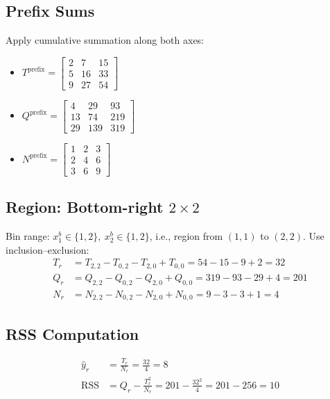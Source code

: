 \documentclass{article}
\begin{document}
\subsection*{Prefix Sums}
Apply cumulative summation along both axes:

\begin{itemize}
    \item $T^{\text{prefix}} = \begin{bmatrix} 2 & 7 & 15 \\ 5 & 16 & 33 \\ 9 & 27 & 54 \end{bmatrix}$
    \item $Q^{\text{prefix}} = \begin{bmatrix} 4 & 29 & 93 \\ 13 & 74 & 219 \\ 29 & 139 & 319 \end{bmatrix}$
    \item $N^{\text{prefix}} = \begin{bmatrix} 1 & 2 & 3 \\ 2 & 4 & 6 \\ 3 & 6 & 9 \end{bmatrix}$
\end{itemize}

\subsection*{Region: Bottom-right $2 \times 2$}
Bin range: $x_1^b \in \{1,2\},\ x_2^b \in \{1,2\}$, i.e., region from $(1,1)$ to $(2,2)$.
Use inclusion--exclusion:
\begin{align*}
T_r &= T_{2,2} - T_{0,2} - T_{2,0} + T_{0,0} = 54 - 15 - 9 + 2 = 32 \\
Q_r &= Q_{2,2} - Q_{0,2} - Q_{2,0} + Q_{0,0} = 319 - 93 - 29 + 4 = 201 \\
N_r &= N_{2,2} - N_{0,2} - N_{2,0} + N_{0,0} = 9 - 3 - 3 + 1 = 4
\end{align*}

\subsection*{RSS Computation}
\begin{align*}
\hat{y}_r &= \frac{T_r}{N_r} = \frac{32}{4} = 8 \\
\text{RSS} &= Q_r - \frac{T_r^2}{N_r} = 201 - \frac{32^2}{4} = 201 - 256 = \boxed{10}
\end{align*}
\end{document}
